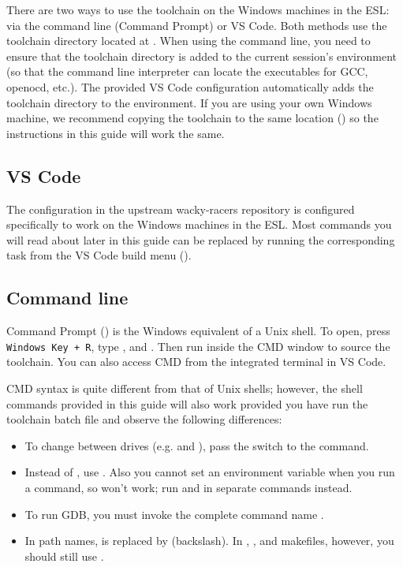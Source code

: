 There are two ways to use the toolchain on the Windows machines in the
ESL: via the command line (Command Prompt) or VS Code. Both methods use
the toolchain directory located at .
When using the command line, you need to ensure that the toolchain
directory is added to the current session's environment (so that the
command line interpreter can locate the executables for GCC, openocd,
etc.). The provided VS Code configuration automatically adds the
toolchain directory to the environment. If you are using your own
Windows machine, we recommend copying the toolchain to the same location
() so the instructions in this guide
will work the same.

\subsection{VS Code}

The  configuration in the upstream wacky-racers repository
is configured specifically to work on the Windows machines in the ESL.
Most  commands you will read about later in this guide can be
replaced by running the corresponding task from the VS Code build menu
().

\subsection{Command line}

Command Prompt () is the Windows equivalent of a Unix
shell. To open, press \verb|Windows Key + R|, type , and
. Then run
 inside the
CMD window to source the toolchain. You can also access CMD from the
integrated terminal in VS Code.

CMD syntax is quite different from that of Unix shells; however, the
shell commands provided in this guide will also work provided you have
run the toolchain batch file and observe the following differences:
\begin{itemize}
\item To change between drives (e.g.  and ), pass the
 switch to the  command.
\item Instead of , use .
Also you cannot set an environment variable when you run a command, so
 won't work; run  and  in
separate commands instead.
\item To run GDB, you must invoke the complete command name
.
\item In path names, \file{/} is replaced by \file{\textbackslash}
(backslash). In , , and makefiles, however, you
should still use \file{/}.
\end{itemize}

